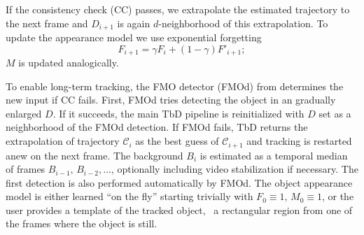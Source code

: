 \documentclass[10pt,twocolumn,letterpaper]{article}
\newcommand{\C}{\mathcal{C}}
\begin{document}
If the consistency check (CC) passes, we extrapolate the estimated trajectory to the next frame and $D_{i+1}$ is again $d$-neighborhood of this extrapolation. To update the appearance model we use exponential forgetting
\begin{equation}\label{eq:update_model}
F_{i+1} = \gamma F_{i} + (1-\gamma)F'_{i+1};
\end{equation}
$M$ is updated analogically. 

To enable long-term tracking, the FMO detector (FMOd) from \cite{fmo} determines the new input if CC fails.
First, FMOd tries detecting the object in an gradually enlarged $D$. If it succeeds, the main TbD pipeline is reinitialized with $D$ set as a neighborhood of the FMOd detection. If FMOd fails, TbD returns the extrapolation of trajectory $\C_i$ as the best guess of $\C_{i+1}$ and tracking is restarted anew on the next frame. The background $B_i$ is estimated as a temporal median of frames $B_{i-1},\,B_{i-2},\ldots$, optionally including video stabilization if necessary. The first detection is also performed automatically by FMOd.  The object appearance model is either learned ``on the fly'' starting trivially with $F_0\equiv1,\,M_0\equiv1$, or the user provides a template of the tracked object, \eg~a rectangular region from one of the frames where the object is still.
\end{document}
